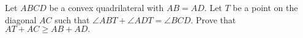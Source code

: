 Let $ABCD$ be a convex quadrilateral with $AB = AD.$ Let $T$ be a point on the diagonal $AC$ such that $\angle ABT + \angle ADT = \angle BCD.$ Prove that $AT + AC \geq  AB + AD.$